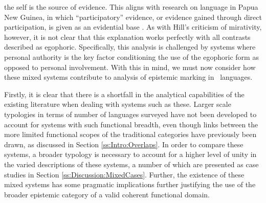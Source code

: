 the self is the source of evidence. This aligns with research on language in Papua New Guinea, in which ``participatory'' evidence, or evidence gained through direct participation, is given as an evidential base \cite{SanRoque2012}. As with Hill's criticism of mirativity, however, it is not clear that this explanation works perfectly with all contrasts described as egophoric. Specifically, this analysis is challenged by systems where personal authority is the key factor conditioning the use of the egophoric form as opposed to personal involvement. With this in mind, we must now consider how these mixed systems contribute to analysis of epistemic marking in \lfam\ languages.

Firstly, it is clear that there is a shortfall in the analytical capabilities of the existing literature when dealing with systems such as these. Larger scale typologies in terms of number of languages surveyed have not been developed to account for systems with such functional breadth, even though links between the more limited functional scopes of the traditional categories have previously been drawn, as discussed in Section \ref{ss:Intro:Overlaps}. In order to compare these systems, a broader typology is necessary to account for a higher level of unity in the varied descriptions of these systems, a number of which are presented as case studies in Section \ref{ss:Discussion:MixedCases}. Further, the existence of these mixed systems has some pragmatic implications further justifying the use of the broader epistemic category of a valid coherent functional domain.

